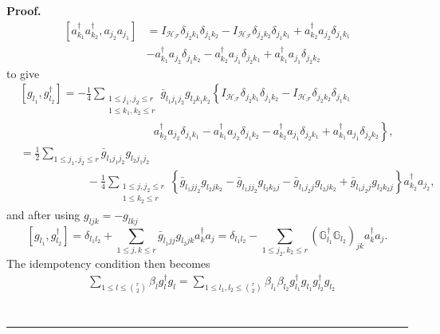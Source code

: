 \documentclass[aps,preprint,amsfonts,amssymb,showpacs,showkeys]{revtex4}%
\newenvironment{proof}[1][Proof]{\noindent\textbf{#1.} }{\ \rule{0.5em}{0.5em}}
\begin{document}
\begin{proof}
\begin{align}
\left[  a_{k_{1}}^{\dagger}a_{k_{2}}^{\dagger},a_{j_{2}}a_{j_{1}}\right]   &
=I_{\mathcal{H}_{\mathcal{F}}}\delta_{j_{2}k_{1}}\delta_{j_{1}k_{2}%
}-I_{\mathcal{H}_{\mathcal{F}}}\delta_{j_{2}k_{2}}\delta_{j_{1}k_{1}}%
+a_{k_{2}}^{\dagger}a_{j_{2}}\delta_{j_{1}k_{1}}\nonumber\\
&  -a_{k_{1}}^{\dagger}a_{j_{2}}\delta_{j_{1}k_{2}}-a_{k_{2}}^{\dagger
}a_{j_{1}}\delta_{j_{2}k_{1}}+a_{k_{1}}^{\dagger}a_{j_{1}}\delta_{j_{2}k_{2}}%
\end{align}
to give
\begin{align}
&  \left[  g_{l_{1}},g_{l_{2}}^{\dagger}\right]  =-\frac{1}{4}\sum
_{\substack{1\leq j_{1},j_{2}\leq r\\1\leq k_{1},k_{2}\leq r}}\bar{g}%
_{l_{1}j_{1}j_{2}}g_{l_{2}k_{1}k_{2}}\left\{  I_{\mathcal{H}_{\mathcal{F}}%
}\delta_{j_{2}k_{1}}\delta_{j_{1}k_{2}}-I_{\mathcal{H}_{\mathcal{F}}}%
\delta_{j_{2}k_{2}}\delta_{j_{1}k_{1}}\right. \nonumber\\
&  \left.  \qquad\qquad\qquad\qquad\qquad\qquad\right.  \left.  a_{k_{2}%
}^{\dagger}a_{j_{2}}\delta_{j_{1}k_{1}}-a_{k_{1}}^{\dagger}a_{j_{2}}%
\delta_{j_{1}k_{2}}-a_{k_{2}}^{\dagger}a_{j_{1}}\delta_{j_{2}k_{1}}+a_{k_{1}%
}^{\dagger}a_{j_{1}}\delta_{j_{2}k_{2}}\right\}  ,\nonumber\\
&  =\frac{1}{2}\sum_{1\leq j_{1},j_{2}\leq r}\bar{g}_{l_{1}j_{1}j_{2}}%
g_{l_{2}j_{1}j_{2}}\nonumber\\
&  \qquad\qquad\qquad-\frac{1}{4}\sum_{\substack{1\leq j,j_{2}\leq r\\1\leq
k_{2}\leq r}}\left\{  \bar{g}_{l_{1}jj_{2}}g_{l_{2}jk_{2}}-\bar{g}%
_{l_{1}jj_{2}}g_{l_{2}k_{2}j}-\bar{g}_{l_{1}j_{2}j}g_{l_{2}jk_{2}}+\bar
{g}_{l_{1}j_{2}j}g_{l_{2}k_{2}j}\right\}  a_{k_{2}}^{\dagger}a_{j_{2}},
\end{align}
and after using $g_{ljk}=-g_{lkj}$
\begin{equation}
\left[  g_{l_{1}},g_{l_{2}}^{\dagger}\right]  =\delta_{l_{1}l_{2}}+\sum_{1\leq
j,k\leq r}\bar{g}_{l_{1}jj}g_{l_{2}jk}a_{k}^{\dagger}a_{j}=\delta_{l_{1}l_{2}%
}-\sum_{1\leq j_{2},k_{2}\leq r}\left(  \mathbb{G}_{l_{1}}^{\dagger}%
\mathbb{G}_{l_{2}}\right)  _{jk}a_{k}^{\dagger}a_{j}.
\end{equation}
The idempotency condition then becomes%
\begin{align}
&  \sum_{1\leq l\leq\binom{r}{2}}\beta_{l}g_{l}^{\dagger}g_{l}=\sum_{1\leq
l_{1},l_{2}\leq\binom{r}{2}}\beta_{l_{1}}\beta_{l_{2}}g_{l_{1}}^{\dagger
}g_{l_{1}}g_{l_{2}}^{\dagger}g_{l_{2}}\nonumber\\

\end{align}
\end{proof}
\end{document}
